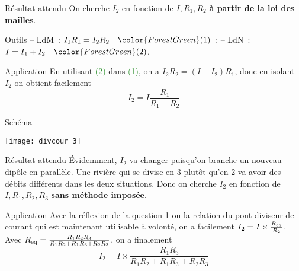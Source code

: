 \documentclass[a4paper, 12pt, final, garamond]{book}
\begin{document}
\begin{tcbraster}[raster columns=3, raster equal height=rows]
    \begin{NCprop}{Résultat attendu}
        On cherche $I_2$ en fonction de $I, R_1, R_2$ \textbf{à partir de la loi
        des mailles}.
    \end{NCprop}
    \begin{NCrapp}{Outils}
        -- LdM~: $I_1R_1 = I_2R_2 \quad \color{ForestGreen}(1)$~;
        \smallbreak
        -- LdN~: $I = I_1 + I_2 \quad \color{ForestGreen}(2)$.
    \end{NCrapp}
    \begin{NCexem}{Application}
        En utilisant \textcolor{ForestGreen}{(2)} dans
        \textcolor{ForestGreen}{(1)}, on a $I_2R_2 = (I-I_2)R_1$, donc en
        isolant $I_2$ on obtient facilement \[\boxed{I_2 = I
        \frac{R_1}{R_1+R_2}}\]
    \end{NCexem}
\end{tcbraster}
\begin{tcbraster}[raster columns=7, raster equal height=rows]
    \begin{tcolorbox}[blankest, raster multicolumn=4, space to=\myspace]
        \begin{tcbraster}[raster columns=1]
    \begin{NCdefi}{Schéma}
        \begin{center}
            \texttt{[image: divcour\_3]}
        \end{center}
    \end{NCdefi}
    \begin{NCprop}{Résultat attendu}
        Évidemment, $I_2$ va changer puisqu'on branche un nouveau dipôle en
        parallèle. Une rivière qui se divise en 3 plutôt qu'en 2 va avoir des
        débits différents dans les deux situations. Donc on cherche $I_2$ en
        fonction de $I, R_1, R_2, R_3$ \textbf{sans méthode imposée}.
    \end{NCprop}
        \end{tcbraster}
    \end{tcolorbox}
    \begin{NCexem}[raster multicolumn=3]{Application}
        Avec la réflexion de la question 1 ou la relation du pont diviseur de
        courant qui est maintenant utilisable à volonté, on a facilement $I_2 =
        I\times \frac{R_{\rm eq}}{R_2}$. Avec $R_{\rm eq} =
        \frac{R_1R_2R_3}{R_1R_2+R_1R_3+R_2R_3}$, on a finalement
        \[\boxed{I_2 = I \times \frac{R_1R_3}{R_1R_2+R_1R_3+R_2R_3}}\]
    \end{NCexem}
\end{tcbraster}
\end{document}
